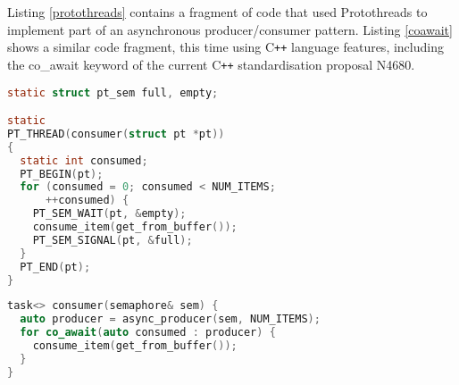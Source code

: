 Listing \ref{protothreads} contains a fragment of code that used Protothreads to implement part of an asynchronous producer/consumer pattern. Listing \ref{coawait} shows a similar code fragment, this time using C{}\verb!++! language features, including the co\_await keyword of the current C{}\verb!++! standardisation proposal N4680. \DIFaddbegin {}\DIFaddend 

\begin{lstlisting}[language=C, caption=Fragment of Protothreads code for asynchronous producer/consumer threads, label=protothreads]
static struct pt_sem full, empty;

static
PT_THREAD(consumer(struct pt *pt))
{
  static int consumed;
  PT_BEGIN(pt);
  for (consumed = 0; consumed < NUM_ITEMS; 
      ++consumed) {
    PT_SEM_WAIT(pt, &empty);
    consume_item(get_from_buffer());
    PT_SEM_SIGNAL(pt, &full);
  }
  PT_END(pt);
}
\end{lstlisting}

\DIFdelbegin %
\DIFdelend \DIFaddbegin \begin{lstlisting}[language=C++, caption=C++ code fragment using co\_await for asynchronous producer/consumer threads, label=coawait]
task<> consumer(semaphore& sem) {
  auto producer = async_producer(sem, NUM_ITEMS);
  for co_await(auto consumed : producer) {
    consume_item(get_from_buffer());
  }
}
\end{lstlisting}
\DIFaddend 

